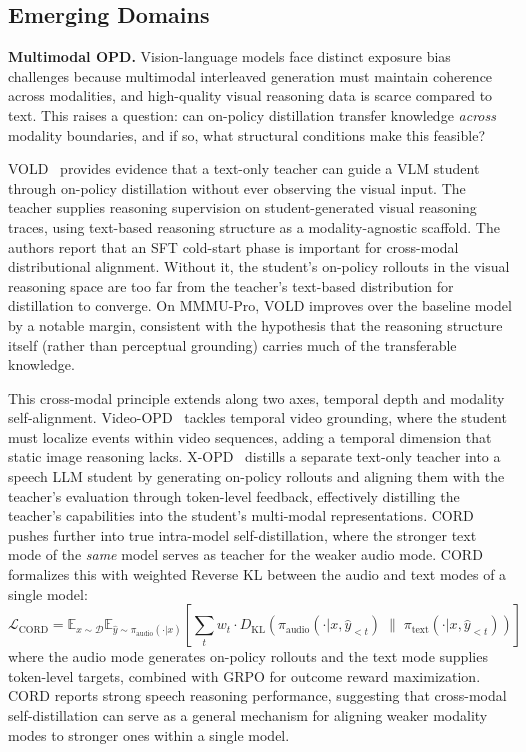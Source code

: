 \documentclass{article} %
\newcommand{\E}{\mathbb{E}}
\newcommand{\KL}{D_{\mathrm{KL}}}
\newcommand{\loss}{\mathcal{L}}
\begin{document}
\subsection{Emerging Domains}
\label{subsec:emerging}

\textbf{Multimodal OPD.} Vision-language models face distinct exposure bias challenges because multimodal interleaved generation must maintain coherence across modalities, and high-quality visual reasoning data is scarce compared to text. This raises a question: can on-policy distillation transfer knowledge \emph{across} modality boundaries, and if so, what structural conditions make this feasible?

VOLD~\citep{2510.23497} provides evidence that a text-only teacher can guide a VLM student through on-policy distillation without ever observing the visual input. The teacher supplies reasoning supervision on student-generated visual reasoning traces, using text-based reasoning structure as a modality-agnostic scaffold. The authors report that an SFT cold-start phase is important for cross-modal distributional alignment. Without it, the student's on-policy rollouts in the visual reasoning space are too far from the teacher's text-based distribution for distillation to converge. On MMMU-Pro, VOLD improves over the baseline model by a notable margin, consistent with the hypothesis that the reasoning structure itself (rather than perceptual grounding) carries much of the transferable knowledge.

This cross-modal principle extends along two axes, temporal depth and modality self-alignment. Video-OPD~\citep{2602.02994} tackles temporal video grounding, where the student must localize events within video sequences, adding a temporal dimension that static image reasoning lacks. X-OPD~\citep{2603.24596} distills a separate text-only teacher into a speech LLM student by generating on-policy rollouts and aligning them with the teacher's evaluation through token-level feedback, effectively distilling the teacher's capabilities into the student's multi-modal representations. CORD~\citep{2601.16547} pushes further into true intra-model self-distillation, where the stronger text mode of the \emph{same} model serves as teacher for the weaker audio mode. CORD formalizes this with weighted Reverse KL between the audio and text modes of a single model:
\begin{equation}
    \loss_{\text{CORD}} = \E_{x \sim \mathcal{D}} \E_{\hat{y} \sim \pi_{\text{audio}}(\cdot|x)} \left[ \sum_{t} w_t \cdot \KL\!\left(\pi_{\text{audio}}(\cdot|x, \hat{y}_{<t}) \;\|\; \pi_{\text{text}}(\cdot|x, \hat{y}_{<t})\right) \right]
\end{equation}
where the audio mode generates on-policy rollouts and the text mode supplies token-level targets, combined with GRPO for outcome reward maximization. CORD reports strong speech reasoning performance, suggesting that cross-modal self-distillation can serve as a general mechanism for aligning weaker modality modes to stronger ones within a single model.
\end{document}
